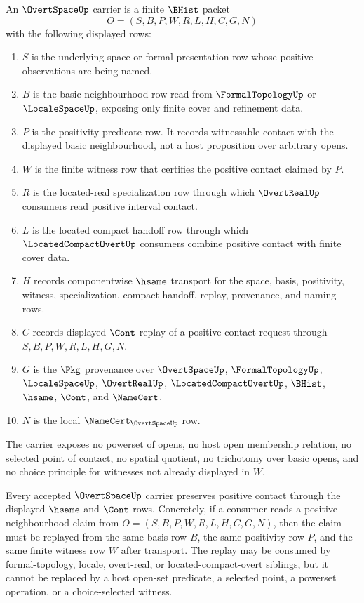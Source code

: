\begin{definition}
\label{def:overt-space-carrier}
An $\OvertSpaceUp$ carrier is a finite $\BHist$ packet
$$
O=(S,B,P,W,R,L,H,C,G,N)
$$
with the following displayed rows:
\begin{enumerate}
\item $S$ is the underlying space or formal presentation row whose positive observations are being named.
\item $B$ is the basic-neighbourhood row read from $\FormalTopologyUp$ or $\LocaleSpaceUp$, exposing only finite cover and refinement data.
\item $P$ is the positivity predicate row. It records witnessable contact with the displayed basic neighbourhood, not a host proposition over arbitrary opens.
\item $W$ is the finite witness row that certifies the positive contact claimed by $P$.
\item $R$ is the located-real specialization row through which $\OvertRealUp$ consumers read positive interval contact.
\item $L$ is the located compact handoff row through which $\LocatedCompactOvertUp$ consumers combine positive contact with finite cover data.
\item $H$ records componentwise $\hsame$ transport for the space, basis, positivity, witness, specialization, compact handoff, replay, provenance, and naming rows.
\item $C$ records displayed $\Cont$ replay of a positive-contact request through $S,B,P,W,R,L,H,G,N$.
\item $G$ is the $\Pkg$ provenance over $\OvertSpaceUp$, $\FormalTopologyUp$, $\LocaleSpaceUp$, $\OvertRealUp$, $\LocatedCompactOvertUp$, $\BHist$, $\hsame$, $\Cont$, and $\NameCert$.
\item $N$ is the local $\NameCert_{\OvertSpaceUp}$ row.
\end{enumerate}
The carrier exposes no powerset of opens, no host open membership relation, no selected point of contact, no spatial quotient, no trichotomy over basic opens, and no choice principle for witnesses not already displayed in $W$.
\end{definition}

\begin{theorem}
\label{thm:overt-space-positivity-stability}
Every accepted $\OvertSpaceUp$ carrier preserves positive contact through the displayed $\hsame$ and $\Cont$ rows. Concretely, if a consumer reads a positive neighbourhood claim from $O=(S,B,P,W,R,L,H,C,G,N)$, then the claim must be replayed from the same basis row $B$, the same positivity row $P$, and the same finite witness row $W$ after transport. The replay may be consumed by formal-topology, locale, overt-real, or located-compact-overt siblings, but it cannot be replaced by a host open-set predicate, a selected point, a powerset operation, or a choice-selected witness.
\end{theorem}

